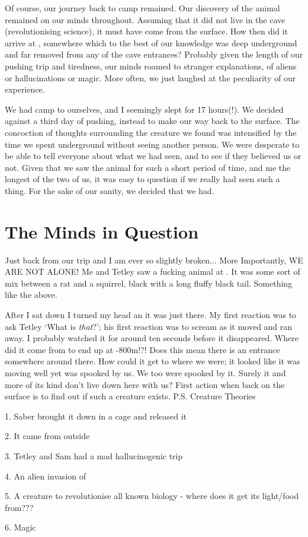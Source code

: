 Of course, our journey back to camp remained. Our discovery of the animal remained on our minds throughout. Assuming that it did not live in the cave (revolutionising science), it must have come from the surface. How then did it arrive at , somewhere which to the best of our knowledge was deep underground and far removed from any of the cave entrances? Probably given the length of our pushing trip and tiredness, our minds roamed to stranger explanations, of aliens or hallucinations or magic. More often, we just laughed at the peculiarity of our experience. 

We had camp to ourselves, and I seemingly slept for 17 hours(!). We decided against a third day of pushing, instead to make our way back to the surface. The concoction of thoughts surrounding the creature we found was intensified by the time we spent underground without seeing another person. We were desperate to be able to tell everyone about what we had seen, and to see if they believed us or not. Given that we saw the animal for such a short period of time, and me the longest of the two of us, it was easy to question if we really had seen such a thing. For the sake of our sanity, we decided that we had. 


\section{The Minds in Question}

Just back from our trip and I am ever so slightly broken...
More Importantly, WE ARE NOT ALONE! Me and Tetley saw a fucking animal at . It was some sort of mix between a rat and a squirrel, black with a long fluffy black tail. Something like the above. 

After I sat down I turned my head an it was just there. My first reaction was to ask Tetley `What is \emph{that}?'; his first reaction was to scream as it moved and ran away. I probably watched it for around ten seconds before it disappeared. Where did it come from to end up at -800m!?! Does this mean there is an entrance somewhere around there. How could it get to where we were; it looked like it was moving well yet was spooked by us. We too were spooked by it. Surely it and more of its kind don't live down here with us? First action when back on the surface is to find out if such a creature exists.
P.S. Creature Theories
\begin{citemize}
\item 1. Saber brought it down in a cage and released it
\item 2. It came from outside
\item 3. Tetley and Sam had a mad hallucinogenic trip
\item 4. An alien invasion of 
\item 5. A creature to revolutionise all known biology - where does it get its light/food from???
\item 6. Magic
\end{citemize}

